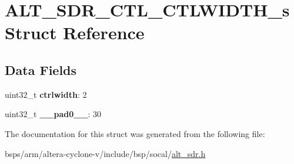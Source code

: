\hypertarget{structALT__SDR__CTL__CTLWIDTH__s}{}\section{A\+L\+T\+\_\+\+S\+D\+R\+\_\+\+C\+T\+L\+\_\+\+C\+T\+L\+W\+I\+D\+T\+H\+\_\+s Struct Reference}
\label{structALT__SDR__CTL__CTLWIDTH__s}
\subsection*{Data Fields}
\begin{DoxyCompactItemize}
\item 
\mbox{\label{structALT__SDR__CTL__CTLWIDTH__s_afc3a5a87b66712d4d48750a28ebddba0}} 
uint32\+\_\+t {\bfseries ctrlwidth}\+: 2
\item 
\mbox{\label{structALT__SDR__CTL__CTLWIDTH__s_a658ad491fd585f06e4c1c3556bc907f5}} 
uint32\+\_\+t {\bfseries \+\_\+\+\_\+pad0\+\_\+\+\_\+}\+: 30
\end{DoxyCompactItemize}


The documentation for this struct was generated from the following file\+:\begin{DoxyCompactItemize}
\item 
bsps/arm/altera-\/cyclone-\/v/include/bsp/socal/\mbox{\hyperlink{alt__sdr_8h}{alt\+\_\+sdr.\+h}}\end{DoxyCompactItemize}
